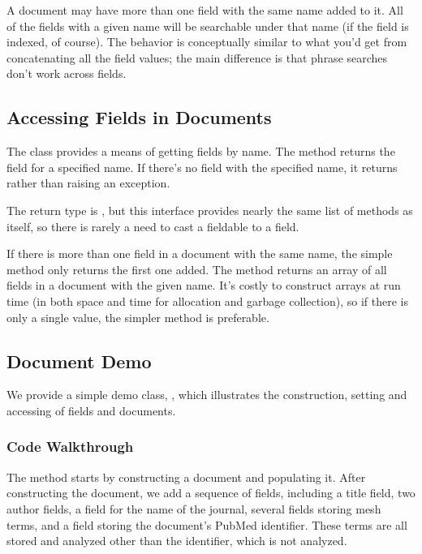 A document may have more than one field with the same name added to
it.  All of the fields with a given name will be searchable under that
name (if the field is indexed, of course).  The behavior is
conceptually similar to what you'd get from concatenating all the
field values; the main difference is that phrase searches
don't work across fields.

\subsection{Accessing Fields in Documents}

The  class provides a means of getting fields by name.
The method  returns the field for a
specified name.  If there's no field with the specified name, it
returns  rather than raising an exception.

The return type is , but this interface provides
nearly the same list of methods as  itself, so there is
rarely a need to cast a fieldable to a field.  

If there is more than one field in a document with the same name, the
simple method  only returns the first one
added.  The method  returns an array of
all fields in a document with the given name.  It's costly to
construct arrays at run time (in both space and time for allocation
and garbage collection), so if there is only a single value, the
simpler method is preferable.



\subsection{Document Demo}

We provide a simple demo class, , which illustrates
the construction, setting and accessing of fields and documents.

\subsubsection{Code Walkthrough}

The  method starts by constructing a document and
populating it.
%
%
After constructing the document, we add a sequence of fields,
including a title field, two author fields, a field for the name of
the journal, several fields storing mesh terms, and a field storing
the document's PubMed identifier.  These terms are all stored
and analyzed other than the identifier, which is not analyzed.

